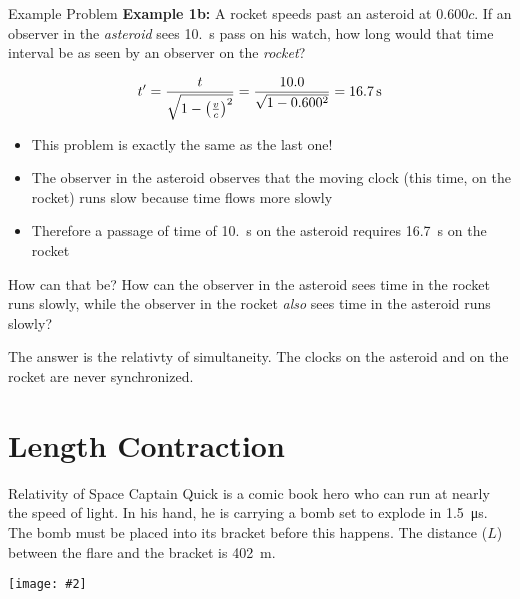\documentclass[12pt,compress,aspectratio=169]{beamer}
\newcommand{\pic}[2]{\texttt{[image: \#2]}}
\newcommand{\bigsqrt}{\ensuremath\sqrt{1-\left(\frac{v}{c}\right)^2}}
\begin{document}
\begin{frame}{Example Problem}
  \textbf{Example 1b:} A rocket speeds past an asteroid at $0.600c$. If an
  observer in the \emph{asteroid} sees \SI{10.}{\second} pass on his watch, how
  long would that time interval be as seen by an observer on the \emph{rocket}?

  \begin{displaymath}
    t' =\frac{t}{\bigsqrt}=\frac{10.0}{\sqrt{1-0.600^2}}=\SI{16.7}{\second}
  \end{displaymath}

  \begin{itemize}
  \item This problem is exactly the same as the last one!
  \item The observer in the asteroid observes that the moving clock
    (this time, on the rocket) runs slow because time flows more slowly
  \item Therefore a passage of time of \SI{10.}{\second} on the asteroid
    requires \SI{16.7}{\second} on the rocket
  \end{itemize}
\end{frame}



\begin{frame}{How can that be?}
  How can the observer in the asteroid sees time in the rocket runs slowly,
  while the observer in the rocket \emph{also} sees time in the asteroid runs
  slowly?

  \vspace{.3in}The answer is the relativty of simultaneity. The clocks on the
  asteroid and on the rocket are never synchronized.
\end{frame}


\section{Length Contraction}

\begin{frame}{Relativity of Space}
  Captain Quick is a comic book hero who can run at nearly the speed of light.
  In his hand, he is carrying a bomb set to explode in \SI{1.5}{\micro\second}.
  The bomb must be placed into its bracket before this happens. The distance
  ($L$) between the flare and the bracket is \SI{402}{\metre}.
  \begin{center}
    \vspace{-.15in}\pic{.7}{graphics/captain-quick.png}
  \end{center}
\end{frame}
\end{document}
